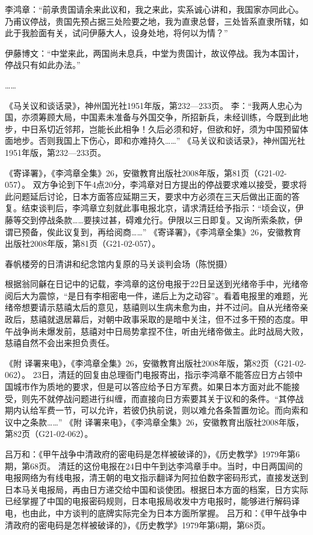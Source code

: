 \documentclass[12pt,UTF8]{ctexbook}
\begin{document}
李鸿章：“前承贵国请余来此议和，我之来此，实系诚心讲和，我国家亦同此心。乃甫议停战，贵国先预占据三处险要之地，我为直隶总督，三处皆系直隶所辖，如此于我脸面有关，试问伊藤大人，设身处地，将何以为情？”

伊藤博文：“中堂来此，两国尚未息兵，中堂为贵国计，故议停战。我为本国计，停战只有如此办法。”

……

《马关议和谈话录》，神州国光社1951年版，第232—233页。
李：“我两人忠心为国，亦须筹顾大局，中国素未准备与外国交争，所招新兵，未经训练，今既到此地步，中日系切近邻邦，岂能长此相争！久后必须和好，但欲和好，须为中国预留体面地步。否则我国上下伤心，即和亦难持久……” 《马关议和谈话录》，神州国光社1951年版，第232—233页。

《寄译署》，《李鸿章全集》26，安徽教育出版社2008年版，第81页（G21-02-057）。
双方争论到下午4点20分，李鸿章对日方提出的停战要求难以接受，要求将此问题延后讨论，日本方面答应延期三天，要求中方必须在三天后做出正面的答复。结束谈判后，李鸿章立刻就此事电报北京，请求清廷给予指示：“顷会议，伊藤等交到停战条款……要挟过甚，碍难允行。伊限以三日即复。又询所索条款，伊谓已预备，俟此议复到，再给阅商……” 《寄译署》，《李鸿章全集》26，安徽教育出版社2008年版，第81页（G21-02-057）。


春帆楼旁的日清讲和纪念馆内复原的马关谈判会场（陈悦摄）

根据翁同龢在日记中的记载，李鸿章的这份电报于22日呈送到光绪帝手中，光绪帝阅后大为震惊，“是日有李相密电一件，递后上为之动容”。看着电报里的难题，光绪帝想要请示慈禧太后的意见，慈禧则以生病未愈为由，并不过问。自从光绪帝亲政后，慈禧就退居幕后，对朝中政事采取的是暗中关注，但不过多干预的态度。甲午战争尚未爆发前，慈禧对中日局势拿捏不住，听由光绪帝做主。此时战局大败，慈禧自然不会出来担负责任。

《附 译署来电》，《李鸿章全集》26，安徽教育出版社2008年版，第82页（G21-02-062）。
23日，清廷的回复由总理衙门电报寄出，指示李鸿章不能答应日方占领中国城市作为质地的要求，但是可以答应给予日方军费。如果日本方面对此不能接受，则先不就停战问题进行纠缠，而直接向日方索要其关于议和的条件。“其停战期内认给军费一节，可以允许，若彼仍执前说，则以难允各条暂置勿论。而向索和议中之条款……” 《附 译署来电》，《李鸿章全集》26，安徽教育出版社2008年版，第82页（G21-02-062）。

吕万和：《甲午战争中清政府的密电码是怎样被破译的》，《历史教学》1979年第6期，第68页。
清廷的这份电报在24日中午到达李鸿章手中。当时，中日两国间的电报网络为有线电报，清王朝的电文指示翻译为阿拉伯数字密码形式，直接发送到日本马关电报局，再由日方递交给中国和谈使团。根据日本方面的档案，日方实际已经掌握了中国的电报密码规则，日本电报局收发中方电报时，能够进行解码译电，也由此，中方谈判的底牌实际完全为日本方面所掌握。 吕万和：《甲午战争中清政府的密电码是怎样被破译的》，《历史教学》1979年第6期，第68页。
\end{document}
